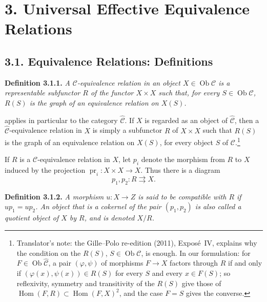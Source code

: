 

\section*{3. Universal Effective Equivalence Relations}

\subsection*{3.1. Equivalence Relations: Definitions}

\noindent{}\textbf{Definition 3.1.1.}
\textit{A \(\mathscr C\)-equivalence relation in an object
\(X\in\operatorname{Ob}\mathscr C\) is a representable subfunctor \(R\) of
the functor \(X\times X\) such that, for every
\(S\in\operatorname{Ob}\mathscr C\), \(R(S)\) is the graph of an equivalence
relation on \(X(S)\).}

 applies in particular to the category
\(\widehat{\mathscr C}\). If \(X\) is regarded as an object of
\(\widehat{\mathscr C}\), then a \(\widehat{\mathscr C}\)-equivalence relation
in \(X\) is simply a subfunctor \(R\) of \(X\times X\) such that \(R(S)\) is
the graph of an equivalence relation on \(X(S)\), for every object \(S\) of
\(\mathscr C\).\footnote{Translator's note: the Gille--Polo re-edition (2011), Expos\'e~IV, explains
why the condition on the \(R(S)\), \(S\in\operatorname{Ob}\mathscr C\), is
enough. In our formulation: for \(F\in\operatorname{Ob}\widehat{\mathscr C}\),
a pair \((\varphi,\psi)\) of morphisms \(F\to X\) factors through \(R\) if and
only if \((\varphi(x),\psi(x))\in R(S)\) for every \(S\) and every
\(x\in F(S)\); so reflexivity, symmetry and transitivity of the \(R(S)\) give
those of \(\operatorname{Hom}(F,R)\subset\operatorname{Hom}(F,X)^2\), and the
case \(F=S\) gives the converse.}

If \(R\) is a \(\mathscr C\)-equivalence relation in \(X\), let \(p_i\)
denote the morphism from \(R\) to \(X\) induced by the projection
\(\operatorname{pr}_i:X\times X\to X\). Thus there is a diagram
\[
  p_1,p_2:R\rightrightarrows X.
\]

\medskip
\noindent{}\textbf{Definition 3.1.2.}
\textit{A morphism \(u:X\to Z\) is said to be \emph{compatible with \(R\)}
if \(up_1=up_2\). An object that is a cokernel of the pair
\((p_1,p_2)\) is also called a \emph{quotient object} of \(X\) by \(R\), and
is denoted \(X/R\).}


